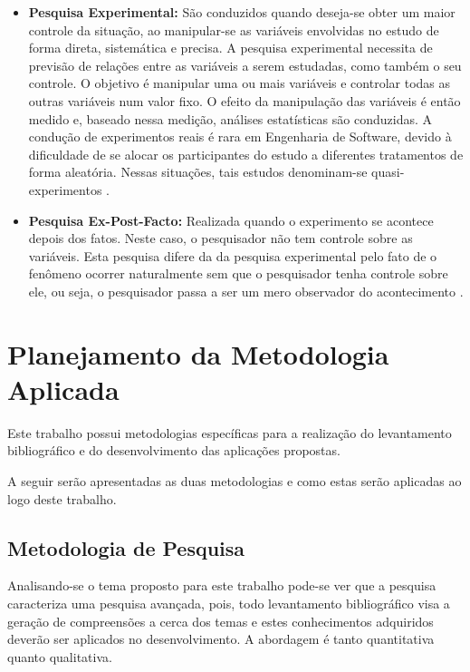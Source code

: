 \begin{itemize}
\begin{itemize}
			\item \textbf{Pesquisa Experimental:} São conduzidos quando deseja-se obter um maior controle da situação, ao manipular-se as variáveis envolvidas no estudo de forma direta, sistemática e precisa. A pesquisa experimental necessita de previsão de relações entre as variáveis a serem estudadas, como também o seu controle. O objetivo é manipular uma ou mais variáveis e controlar todas as outras variáveis num valor fixo. O efeito da manipulação das variáveis é então medido e, baseado nessa medição, análises estatísticas são conduzidas. A condução de experimentos reais é rara em Engenharia de Software, devido à dificuldade de se alocar os participantes do estudo a diferentes tratamentos de forma aleatória. Nessas situações, tais estudos denominam-se quasi-experimentos \cite{Mafra:Travassos:2006}.
			
			\item \textbf{Pesquisa Ex-Post-Facto:} Realizada quando o experimento se acontece depois dos fatos. Neste caso, o pesquisador não tem controle sobre as variáveis. Esta pesquisa difere da da pesquisa experimental pelo fato de o fenômeno ocorrer naturalmente sem que o pesquisador tenha controle sobre ele, ou seja, o pesquisador passa a ser um mero observador do acontecimento \cite{Silva:Tafner:2007}.
		\end{itemize}

\end{itemize}

\section{Planejamento da Metodologia Aplicada}

Este trabalho possui metodologias específicas para a realização do levantamento bibliográfico e do desenvolvimento das aplicações propostas.

A seguir serão apresentadas as duas metodologias e como estas serão aplicadas ao logo deste trabalho.

\subsection{Metodologia de Pesquisa}

Analisando-se o tema proposto para este trabalho pode-se ver que a pesquisa caracteriza uma pesquisa avançada, pois, todo levantamento bibliográfico visa a geração de compreensões a cerca dos temas e estes conhecimentos adquiridos deverão ser aplicados no desenvolvimento. A abordagem é tanto quantitativa quanto qualitativa.

